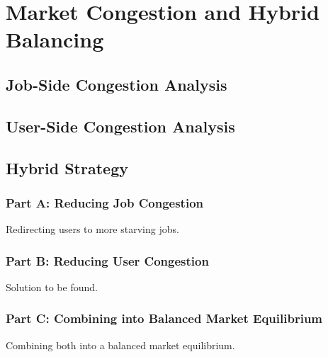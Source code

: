 \chapter{Market Congestion and Hybrid Balancing}
\label{chap:congestion_balancing}

\section{Job-Side Congestion Analysis}
\label{sec:job_congestion}

\section{User-Side Congestion Analysis}
\label{sec:user_congestion}

\section{Hybrid Strategy}
\label{sec:hybrid_strategy}

\subsection{Part A: Reducing Job Congestion}
\label{sec:hybrid_job_congestion}

Redirecting users to more starving jobs.

\subsection{Part B: Reducing User Congestion}
\label{sec:hybrid_user_congestion}

Solution to be found.

\subsection{Part C: Combining into Balanced Market Equilibrium}
\label{sec:hybrid_balance}

Combining both into a balanced market equilibrium.
